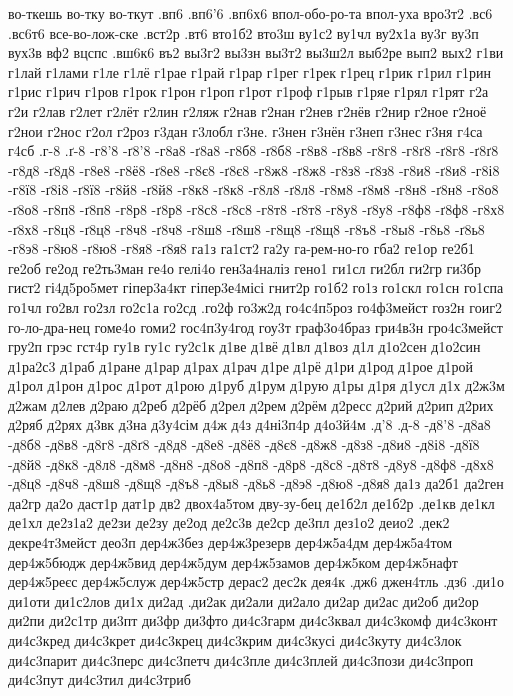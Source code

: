 {{во-ткешь
во-тку
во-ткут
.вп6
.вп6'6
.вп6х6
впол-обо-ро-та
впол-уха
вро3т2
.вс6
.вс6т6
все-во-лож-ске
.вст2р
.вт6
вто1б2
вто3ш
ву1с2
ву1чл
ву2х1а
ву3г
ву3п
вух3в
вф2
вцспс
.вш6к6
въ2
вы3г2
вы3зн
вы3т2
вы3ш2л
выб2ре
вып2
вых2
г1ви
г1лай
г1лами
г1ле
г1лё
г1рае
г1рай
г1рар
г1рег
г1рек
г1рец
г1рик
г1рил
г1рин
г1рис
г1рич
г1ров
г1рок
г1рон
г1роп
г1рот
г1роф
г1рыв
г1ряе
г1рял
г1рят
г2а
г2и
г2лав
г2лет
г2лёт
г2лин
г2ляж
г2нав
г2нан
г2нев
г2нёв
г2нир
г2ное
г2ноё
г2нои
г2нос
г2ол
г2роз
г3дан
г3лобл
г3не.
г3нен
г3нён
г3неп
г3нес
г3ня
г4са
г4сб
.г-8
.ґ-8
-г8'8
-ґ8'8
-г8а8
-ґ8а8
-г8б8
-ґ8б8
-г8в8
-ґ8в8
-г8г8
-г8ґ8
-ґ8г8
-ґ8ґ8
-г8д8
-ґ8д8
-г8е8
-г8ё8
-ґ8е8
-г8є8
-ґ8є8
-г8ж8
-ґ8ж8
-г8з8
-ґ8з8
-г8и8
-ґ8и8
-г8і8
-г8ї8
-ґ8і8
-ґ8ї8
-г8й8
-ґ8й8
-г8к8
-ґ8к8
-г8л8
-ґ8л8
-г8м8
-ґ8м8
-г8н8
-ґ8н8
-г8о8
-ґ8о8
-г8п8
-ґ8п8
-г8р8
-ґ8р8
-г8с8
-ґ8с8
-г8т8
-ґ8т8
-г8у8
-ґ8у8
-г8ф8
-ґ8ф8
-г8х8
-ґ8х8
-г8ц8
-ґ8ц8
-г8ч8
-ґ8ч8
-г8ш8
-ґ8ш8
-г8щ8
-ґ8щ8
-г8ъ8
-г8ы8
-г8ь8
-ґ8ь8
-г8э8
-г8ю8
-ґ8ю8
-г8я8
-ґ8я8
га1з
га1ст2
га2у
га-рем-но-го
гба2
ге1ор
ге2б1
ге2об
ге2од
ге2ть3ман
ге4о
гелі4о
ген3а4наліз
гено1
ги1сл
ги2бл
ги2гр
ги3бр
гист2
гі4д5ро5мет
гіпер3а4кт
гіпер3е4місі
гнит2р
го1б2
го1з
го1скл
го1сн
го1спа
го1чл
го2вл
го2зл
го2с1а
го2сд
.го2ф
го3ж2д
го4с4п5роз
го4ф3мейст
гоз2н
гоиг2
го-ло-дра-нец
гоме4о
гоми2
гос4п3у4год
гоу3т
граф3о4браз
гри4в3н
гро4с3мейст
гру2п
грэс
гст4р
гу1в
гу1с
гу2с1к
д1ве
д1вё
д1вл
д1воз
д1л
д1о2сен
д1о2син
д1ра2с3
д1раб
д1ране
д1рар
д1рах
д1рач
д1ре
д1рё
д1ри
д1род
д1рое
д1рой
д1рол
д1рон
д1рос
д1рот
д1рою
д1руб
д1рум
д1рую
д1ры
д1ря
д1усл
д1х
д2ж3м
д2жам
д2лев
д2раю
д2реб
д2рёб
д2рел
д2рем
д2рём
д2ресс
д2рий
д2рип
д2рих
д2ряб
д2рях
д3вк
д3на
д3у4сім
д4ж
д4з
д4ні3п4р
д4о3й4м
.д'8
.д-8
-д8'8
-д8а8
-д8б8
-д8в8
-д8г8
-д8ґ8
-д8д8
-д8е8
-д8ё8
-д8є8
-д8ж8
-д8з8
-д8и8
-д8і8
-д8ї8
-д8й8
-д8к8
-д8л8
-д8м8
-д8н8
-д8о8
-д8п8
-д8р8
-д8с8
-д8т8
-д8у8
-д8ф8
-д8х8
-д8ц8
-д8ч8
-д8ш8
-д8щ8
-д8ъ8
-д8ы8
-д8ь8
-д8э8
-д8ю8
-д8я8
да1з
да2б1
да2ген
да2гр
да2о
даст1р
дат1р
дв2
двох4а5том
дву-зу-бец
де1б2л
де1б2р
.де1кв
де1кл
де1хл
де2з1а2
де2зи
де2зу
де2од
де2с3в
де2ср
де3пл
дез1о2
деио2
.дек2
декре4т3мейст
део3п
дер4ж3без
дер4ж3резерв
дер4ж5а4дм
дер4ж5а4том
дер4ж5бюдж
дер4ж5вид
дер4ж5дум
дер4ж5замов
дер4ж5ком
дер4ж5нафт
дер4ж5реєс
дер4ж5служ
дер4ж5стр
дерас2
дес2к
дея4к
.дж6
джен4тль
.дз6
.ди1о
ди1оти
ди1с2лов
ди1х
ди2ад
.ди2ак
ди2али
ди2ало
ди2ар
ди2ас
ди2об
ди2ор
ди2пи
ди2с1тр
ди3пт
ди3фр
ди3фто
ди4с3гарм
ди4с3квал
ди4с3комф
ди4с3конт
ди4с3кред
ди4с3крет
ди4с3крец
ди4с3крим
ди4с3кусі
ди4с3куту
ди4с3лок
ди4с3парит
ди4с3перс
ди4с3петч
ди4с3пле
ди4с3плей
ди4с3пози
ди4с3проп
ди4с3пут
ди4с3тил
ди4с3триб
}}
